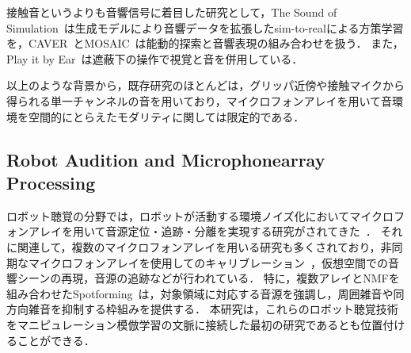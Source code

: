 \documentclass{article}
\begin{document}
接触音というよりも音響信号に着目した研究として，The Sound of Simulation~\citep{multigen2025}は生成モデルにより音響データを拡張したsim-to-realによる方策学習を，CAVER~\citep{caver2025}とMOSAIC~\citep{mosaic2024}は能動的探索と音響表現の組み合わせを扱う．
また，Play it by Ear~\citep{playitbyear}は遮蔽下の操作で視覚と音を併用している．

以上のような背景から，既存研究のほとんどは，グリッパ近傍や接触マイクから得られる単一チャンネルの音を用いており，マイクロフォンアレイを用いて音環境を空間的にとらえたモダリティに関しては限定的である．

\subsection{Robot Audition and Microphonearray Processing}
ロボット聴覚の分野では，ロボットが活動する環境ノイズ化においてマイクロフォンアレイを用いて音源定位・追跡・分離を実現する研究がされてきた~\citep{nakadai2020robotaudition,robotaudition_review2025}．
それに関連して，複数のマイクロフォンアレイを用いる研究も多くされており，非同期なマイクロフォンアレイを使用してのキャリブレーション~\citep{wang2024slamcalib}，仮想空間での音響シーンの再現\cite{gabriel20192d}，音源の追跡\citep{yamada2020sound}などが行われている．
特に，複数アレイとNMFを組み合わせたSpotforming~\citep{spotforming_nmf}は，対象領域に対応する音源を強調し，周囲雑音や同方向雑音を抑制する枠組みを提供する．
本研究は，これらのロボット聴覚技術をマニピュレーション模倣学習の文脈に接続した最初の研究であるとも位置付けることができる．
\end{document}
